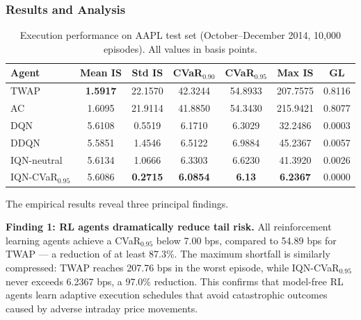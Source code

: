 \documentclass[11pt]{article}
\begin{document}
\subsubsection*{Results and Analysis}


\begin{table}[H]
    \centering
   
    \begin{tabular}{@{}lcccccc@{}}
        \toprule
        \textbf{Agent} & \textbf{Mean IS} & \textbf{Std IS} & \textbf{CVaR$_{0.90}$} & \textbf{CVaR$_{0.95}$} & \textbf{Max IS} & \textbf{GL} \\
        \midrule
        TWAP               & \textbf{1.5917}  & 22.1570 & 42.3244 & 54.8933 & 207.7575 & 0.8116 \\
        AC                 & 1.6095  & 21.9114 & 41.8850 & 54.3430 & 215.9421 & 0.8077 \\
        DQN                & 5.6108  &  0.5519 &  6.1710 &  6.3029 &  32.2486 & 0.0003 \\
        DDQN               & 5.5851  &  1.4546 &  6.5122 &  6.9884 &  45.2367 & 0.0057 \\
        IQN-neutral        & 5.6134  &  1.0666 &  6.3303 &  6.6230 &  41.3920 & 0.0026 \\
        IQN-CVaR$_{0.95}$  & 5.6086  &  \textbf{0.2715} &  \textbf{6.0854} &  \textbf{6.13} &  \textbf{ 6.2367} & 0.0000 \\
        \bottomrule
    \end{tabular}

     \caption{Execution performance on AAPL test set (October--December 2014, 10{,}000 episodes). All values in basis points.}
    \label{tab:taq_results}
\end{table}

The empirical results reveal three principal findings.

\textbf{Finding 1: RL agents dramatically reduce tail risk.}  All reinforcement learning agents achieve a CVaR$_{0.95}$ below 7.00 bps, compared to 54.89 bps for TWAP --- a reduction of at least 87.3\%.  The maximum shortfall is similarly compressed: TWAP reaches 207.76 bps in the worst episode, while IQN-CVaR$_{0.95}$ never exceeds 6.2367 bps, a 97.0\% reduction.  This confirms that model-free RL agents learn adaptive execution schedules that avoid catastrophic outcomes caused by adverse intraday price movements.
\end{document}
